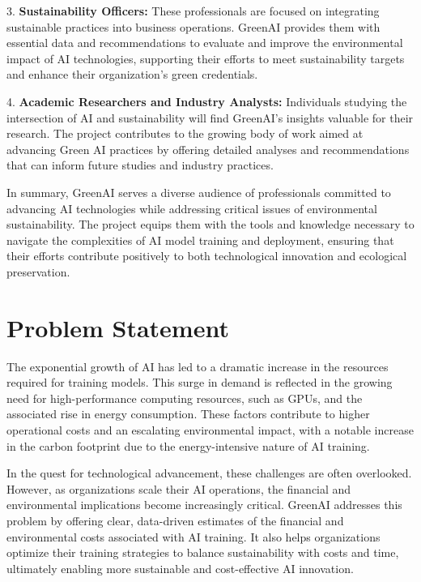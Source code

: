 \documentclass{report}
\begin{document}
3. \textbf{Sustainability Officers:} These professionals are focused on integrating sustainable practices into business operations. GreenAI provides them with essential data and recommendations to evaluate and improve the environmental impact of AI technologies, supporting their efforts to meet sustainability targets and enhance their organization's green credentials.

4. \textbf{Academic Researchers and Industry Analysts:} Individuals studying the intersection of AI and sustainability will find GreenAI’s insights valuable for their research. The project contributes to the growing body of work aimed at advancing Green AI practices by offering detailed analyses and recommendations that can inform future studies and industry practices.

In summary, GreenAI serves a diverse audience of professionals committed to advancing AI technologies while addressing critical issues of environmental sustainability. The project equips them with the tools and knowledge necessary to navigate the complexities of AI model training and deployment, ensuring that their efforts contribute positively to both technological innovation and ecological preservation.



\section{Problem Statement}

The exponential growth of AI has led to a dramatic increase in the resources required for training models. This surge in demand is reflected in the growing need for high-performance computing resources, such as GPUs, and the associated rise in energy consumption. These factors contribute to higher operational costs and an escalating environmental impact, with a notable increase in the carbon footprint due to the energy-intensive nature of AI training.

In the quest for technological advancement, these challenges are often overlooked. However, as organizations scale their AI operations, the financial and environmental implications become increasingly critical. GreenAI addresses this problem by offering clear, data-driven estimates of the financial and environmental costs associated with AI training. It also helps organizations optimize their training strategies to balance sustainability with costs and time, ultimately enabling more sustainable and cost-effective AI innovation.
\end{document}
